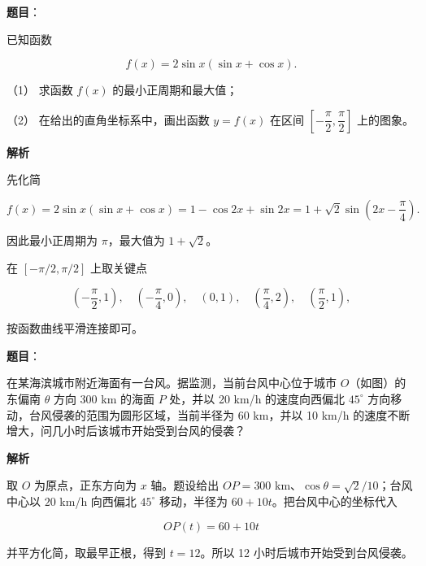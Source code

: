 \begin{answer}

\textbf{题目}：

已知函数

\nopagebreak[4]
\[
f(x)=2\sin x(\sin x+\cos x).
\]

（1） 求函数 $f(x)$ 的最小正周期和最大值；

（2） 在给出的直角坐标系中，画出函数 $y=f(x)$ 在区间 $\left[-\dfrac\pi2,\dfrac\pi2\right]$ 上的图象。
\nopagebreak[4]
\begin{center}\end{center}
\nopagebreak[4]
\textbf{解析}


先化简

\nopagebreak[4]
\[
f(x)=2\sin x(\sin x+\cos x)
=1-\cos2x+\sin2x
=1+\sqrt2\sin\left(2x-\frac\pi4\right).
\]

因此最小正周期为 $\pi$，最大值为 $1+\sqrt2$。


在 $\left[-\pi/2,\pi/2\right]$ 上取关键点

\nopagebreak[4]
\[
\left(-\frac\pi2,1\right),\quad
\left(-\frac\pi4,0\right),\quad
(0,1),\quad
\left(\frac\pi4,2\right),\quad
\left(\frac\pi2,1\right),
\]

按函数曲线平滑连接即可。



\end{answer}
\begin{answer}

\textbf{题目}：

在某海滨城市附近海面有一台风。据监测，当前台风中心位于城市 $O$（如图）的东偏南 $\theta$ 方向 300 km 的海面 $P$ 处，并以 20 km/h 的速度向西偏北 $45^\circ$ 方向移动，台风侵袭的范围为圆形区域，当前半径为 60 km，并以 10 km/h 的速度不断增大，问几小时后该城市开始受到台风的侵袭？
\nopagebreak[4]
\begin{center}\end{center}
\nopagebreak[4]
\textbf{解析}

取 $O$ 为原点，正东方向为 $x$ 轴。题设给出 $OP=300$ km、$\cos\theta=\sqrt2/10$；台风中心以 $20$ km/h 向西偏北 $45^\circ$ 移动，半径为 $60+10t$。把台风中心的坐标代入

\nopagebreak[4]
\[
OP(t)=60+10t
\]

并平方化简，取最早正根，得到 $t=12$。所以 12 小时后城市开始受到台风侵袭。


\end{answer}

